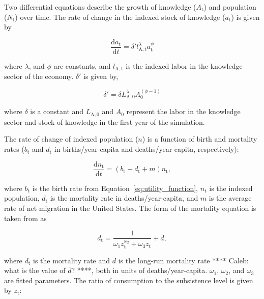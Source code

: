 \documentclass[letterpaper,12pt]{article}
\begin{document}
Two differential equations describe the growth of knowledge ($A_\mathrm{t}$) and population ($N_\mathrm{t}$) over time. The rate of change in the indexed stock of knowledge ($a_\mathrm{t}$) is given by

\begin{equation} \label{eq:da_dt}
	\frac{\mathrm{d}a_\mathrm{t}}{\mathrm{d}t} = \delta' l_\mathrm{A,t}^\lambda a_\mathrm{t}^\phi
\end{equation}

\noindent where $\lambda$, and $\phi$ are constants, and $l_\mathrm{A,t}$ is the indexed labor in the knowledge sector of the economy. $\delta'$ is given by,

\begin{equation} \label{eq:delta}
	\delta' = \delta L_\mathrm{A,0}^\lambda A_\mathrm{0}^{(\phi - 1)}
\end{equation}

\noindent where $\delta$ is a constant and $L_\mathrm{A,0}$ and $A_\mathrm{0}$ represent the labor in the knowledge sector and stock of knowledge in the first year of the simulation. 

The rate of change of indexed population ($n$) is a function of birth and mortality rates ($b_\mathrm{t}$ and $d_\mathrm{t}$ in births/year-capita and deaths/year-capita, respectively):

\begin{equation} \label{eq:dn_dt}
	\frac{\mathrm{d}n_\mathrm{t}}{\mathrm{d}t} = (b_\mathrm{t} - d_\mathrm{t} + m) n_\mathrm{t},
\end{equation}

\noindent where $b_\mathrm{t}$ is the birth rate from Equation~\ref{eq:utility_function}, $n_\mathrm{t}$ is the indexed population, $d_\mathrm{t}$ is the mortality rate in deaths/year-capita, and $m$ is the average rate of net migration in the United States. The form of the mortality equation is taken from \citet{Jones:2001wn} as

\begin{equation} \label{eq:mortality_rate}
	d_\mathrm{t} = \frac{1}{\omega_\mathrm{1} z_\mathrm{t}^{\omega_\mathrm{2}} + \omega_\mathrm{3} z_\mathrm{t}} + \bar d,
\end{equation}

\noindent where $d_\mathrm{t}$ is the mortality rate and $\bar d$ is the long-run mortality rate **** Caleb: what is the value of $\bar{d}$? ****, both in units of deaths/year-capita. $\omega_\mathrm{1}$, $\omega_\mathrm{2}$, and $\omega_\mathrm{3}$ are fitted parameters. The ratio of consumption to the subsistence level is given by $z_\mathrm{t}$:
\end{document}
